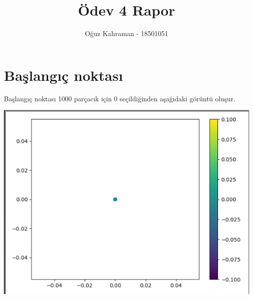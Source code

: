 \documentclass{article}
\title{Ödev 4 Rapor}
\author{Oğuz Kahraman - 18501051}
\begin{document}
	\maketitle

	\section{Başlangıç noktası}
	Başlangıç noktası 1000 parçacık için 0 seçildiğinden aşağıdaki görüntü oluşur.
	\begin{center}
		\includegraphics[scale=0.8]{startpoint}
	\end{center}
\end{document}
